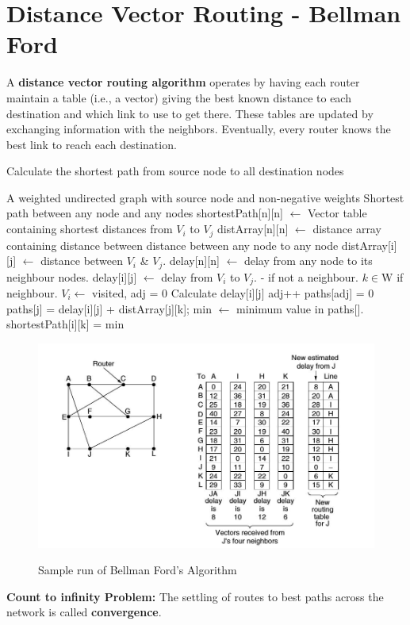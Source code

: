 \documentclass[a4paper,oneside]{book}
\begin{document}
\section{Distance Vector Routing - Bellman Ford}
A \textbf{distance vector routing algorithm} operates by having each router maintain a table (i.e., a vector) giving the best known distance to each destination and which link to use to get there.  These tables are updated by exchanging information with the neighbors. Eventually, every router knows the best link to reach each destination.
\begin{algorithm}[H]
\caption{Calculate the shortest path from source node to all destination nodes}
\label{fig:cn_dis_vt_algo}
\begin{algorithmic}[1]
\REQUIRE A weighted undirected graph with source node and non-negative weights
\ENSURE Shortest path between any node and any nodes
\STATE shortestPath[n][n] $\leftarrow$ Vector table containing shortest distances from $V_i$ to $V_j$
\STATE distArray[n][n] $\leftarrow$ distance array containing distance between distance between any node to any node
\STATE distArray[i][j] $\leftarrow$ distance between $V_i$ \& $V_j$.
\STATE delay[n][n] $\leftarrow$ delay from any node to its neighbour nodes.
\STATE delay[i][j] $\leftarrow$ delay from $V_i$ to $V_j$. - if not a neighbour. $k \in \mathrm{W}$ if neighbour.
\STATE $V_i \leftarrow$ visited, adj = 0 
\STATE Calculate delay[i][j]
\STATE adj++
\ENDFOR
\STATE paths[adj] = {0}
\STATE paths[j] = delay[i][j] + distArray[j][k];
\ENDFOR
\STATE min $\leftarrow$ minimum value in  paths[].
\STATE shortestPath[i][k] = min
\ENDFOR
\ENDWHILE
\end{algorithmic}
\end{algorithm}
\begin{figure}[H]
\caption{Sample run of Bellman Ford's Algorithm}
\includegraphics[scale=0.6]{Images/bellman_algo}
\label{fig:cn_bellman_algo}
\end{figure}
\textbf{Count to infinity Problem:} The settling of routes to best paths across the network is called \textbf{convergence}.
\end{document}
